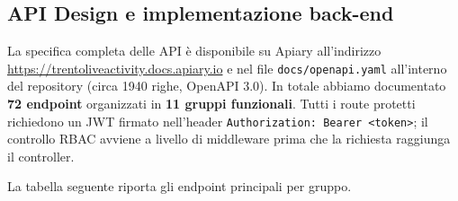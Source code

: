 \documentclass[11pt,a4paper]{article}
\newcommand{\code}[1]{\texttt{\small#1}}
\begin{document}
  \subsection{API Design e implementazione back-end}

  La specifica completa delle API \`{e} disponibile su Apiary all'indirizzo
  \url{https://trentoliveactivity.docs.apiary.io} e nel file \code{docs/openapi.yaml}
  all'interno del repository (circa 1940 righe, OpenAPI 3.0). In totale abbiamo
  documentato \textbf{72 endpoint} organizzati in \textbf{11 gruppi funzionali}. Tutti i route
  protetti richiedono un JWT firmato nell'header \code{Authorization: Bearer <token>};
  il controllo RBAC avviene a livello di middleware prima che la richiesta raggiunga
  il controller.

  La tabella seguente riporta gli endpoint principali per gruppo.
\end{document}
